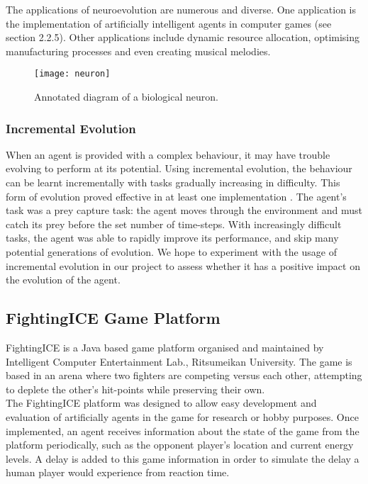 \documentclass[12pt,a4paper]{article}
\begin{document}
The applications of neuroevolution are numerous and diverse. One application is the implementation of artificially intelligent agents in computer games (see section 2.2.5). Other applications include dynamic resource allocation, optimising manufacturing processes and even creating musical melodies. \cite{neapps}
\begin{figure}[h]
\begin{center}
\texttt{[image: neuron]}
\caption{Annotated diagram of a biological neuron.}
\end{center}
\end{figure}
\vspace{-7mm}
\subsubsection{Incremental Evolution}
When an agent is provided with a complex behaviour, it may have trouble evolving to perform at its potential. Using incremental evolution, the behaviour can be learnt incrementally with tasks gradually increasing in difficulty. This form of evolution proved effective in at least one implementation \cite{incre}. The agent's task was a prey capture task: the agent moves through the environment and must catch its prey before the set number of time-steps. With increasingly difficult tasks, the agent was able to rapidly improve its performance, and skip many potential generations of evolution. We hope to experiment with the usage of incremental evolution in our project to assess whether it has a positive impact on the evolution of the agent.
\newpage
\subsection{FightingICE Game Platform}
FightingICE is a Java based game platform organised and maintained by Intelligent Computer Entertainment Lab., Ritsumeikan University. The game is based in an arena where two fighters are competing versus each other, attempting to deplete the other's hit-points while preserving their own.\\ 

The FightingICE platform was designed to allow easy development and evaluation of artificially agents in the game for research or hobby purposes. Once implemented, an agent receives information about the state of the game from the platform periodically, such as the opponent player's location and current energy levels. A delay is added to this game information in order to simulate the delay a human player would experience from reaction time. \cite{fightingice}\\
\end{document}
